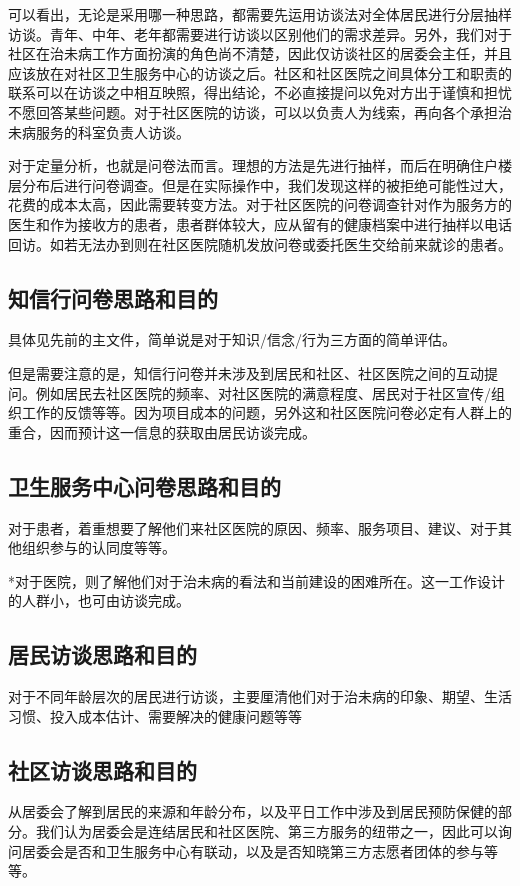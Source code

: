 \documentclass{article}
\begin{document}
    可以看出，无论是采用哪一种思路，都需要先运用访谈法对全体居民进行分层抽样访谈。青年、中年、老年都需要进行访谈以区别他们的需求差异。另外，我们对于社区在治未病工作方面扮演的角色尚不清楚，因此仅访谈社区的居委会主任，并且应该放在对社区卫生服务中心的访谈之后。社区和社区医院之间具体分工和职责的联系可以在访谈之中相互映照，得出结论，不必直接提问以免对方出于谨慎和担忧不愿回答某些问题。对于社区医院的访谈，可以以负责人为线索，再向各个承担治未病服务的科室负责人访谈。
    
    对于定量分析，也就是问卷法而言。理想的方法是先进行抽样，而后在明确住户楼层分布后进行问卷调查。但是在实际操作中，我们发现这样的被拒绝可能性过大，花费的成本太高，因此需要转变方法。对于社区医院的问卷调查针对作为服务方的医生和作为接收方的患者，患者群体较大，应从留有的健康档案中进行抽样以电话回访。如若无法办到则在社区医院随机发放问卷或委托医生交给前来就诊的患者。
    
    \subsection{知信行问卷思路和目的}
    具体见先前的主文件，简单说是对于知识/信念/行为三方面的简单评估。
    
    但是需要注意的是，知信行问卷并未涉及到居民和社区、社区医院之间的互动提问。例如居民去社区医院的频率、对社区医院的满意程度、居民对于社区宣传/组织工作的反馈等等。因为项目成本的问题，另外这和社区医院问卷必定有人群上的重合，因而预计这一信息的获取由居民访谈完成。
        \subsection{卫生服务中心问卷思路和目的}
        对于患者，着重想要了解他们来社区医院的原因、频率、服务项目、建议、对于其他组织参与的认同度等等。
        
        *对于医院，则了解他们对于治未病的看法和当前建设的困难所在。这一工作设计的人群小，也可由访谈完成。
            \subsection{居民访谈思路和目的}
            对于不同年龄层次的居民进行访谈，主要厘清他们对于治未病的印象、期望、生活习惯、投入成本估计、需要解决的健康问题等等
             \subsection{社区访谈思路和目的}
            从居委会了解到居民的来源和年龄分布，以及平日工作中涉及到居民预防保健的部分。我们认为居委会是连结居民和社区医院、第三方服务的纽带之一，因此可以询问居委会是否和卫生服务中心有联动，以及是否知晓第三方志愿者团体的参与等等。
\end{document}
